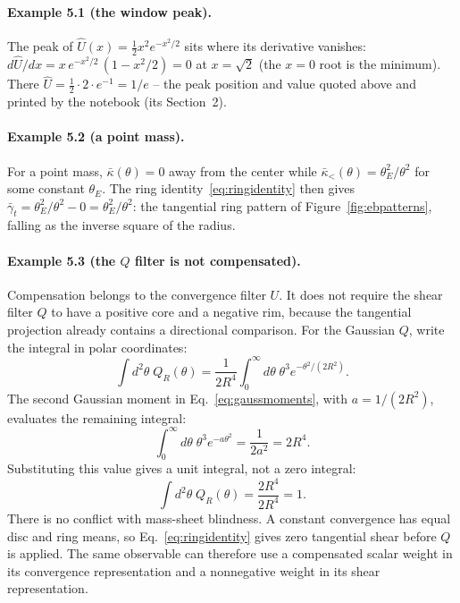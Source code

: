 \documentclass[11pt]{article}
\newcommand{\Uhat}{\widehat{U}}
\numberwithin{equation}{section}
\begin{document}
\paragraph{Example 5.1 (the window peak).}
The peak of $\Uhat(x) = \tfrac12 x^2 e^{-x^2/2}$ sits where its
derivative vanishes:
$d\Uhat/dx = x\, e^{-x^2/2}\,(1 - x^2/2) = 0$ at $x = \sqrt{2}$
(the $x = 0$ root is the minimum).  There
$\Uhat = \tfrac12\cdot 2\cdot e^{-1} = 1/e$ -- the peak position and
value quoted above and printed by the notebook (its Section~2).

\paragraph{Example 5.2 (a point mass).}
For a point mass, $\bar\kappa(\theta) = 0$ away from the center
while $\bar\kappa_<(\theta) = \theta_E^2/\theta^2$ for some constant
$\theta_E$.  The ring identity~\eqref{eq:ringidentity} then gives
$\bar\gamma_t = \theta_E^2/\theta^2 - 0 = \theta_E^2/\theta^2$: the
tangential ring pattern of Figure~\ref{fig:ebpatterns}, falling as
the inverse square of the radius.

\paragraph{Example 5.3 (the $Q$ filter is not compensated).}
Compensation belongs to the convergence filter $U$. It does not require
the shear filter $Q$ to have a positive core and a negative rim, because
the tangential projection already contains a directional comparison.
For the Gaussian $Q$, write the integral in polar coordinates:
\begin{equation}
 \int d^2\theta\;Q_R(\theta)
 =\frac{1}{2R^4}\int_0^\infty d\theta\;
          \theta^3 e^{-\theta^2/(2R^2)}.
\end{equation}
The second Gaussian moment in Eq.~\eqref{eq:gaussmoments}, with
$a=1/(2R^2)$, evaluates the remaining integral:
\begin{equation}
 \int_0^\infty d\theta\;\theta^3 e^{-a\theta^2}
 =\frac{1}{2a^2}=2R^4.
\end{equation}
Substituting this value gives a unit integral, not a zero integral:
\begin{equation}
 \int d^2\theta\;Q_R(\theta)=\frac{2R^4}{2R^4}=1.
\end{equation}
There is no conflict with mass-sheet blindness. A constant convergence
has equal disc and ring means, so Eq.~\eqref{eq:ringidentity} gives zero
tangential shear before $Q$ is applied. The same observable can therefore
use a compensated scalar weight in its convergence representation and
a nonnegative weight in its shear representation.
\end{document}
